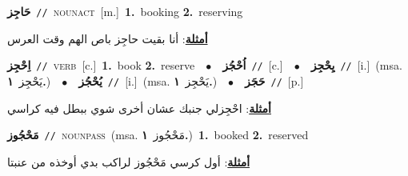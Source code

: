 \documentclass[10pt,a4paper,twoside]{article} %
\begin{document}
\begin{multicols}{2}
{{{{{{{{{{{\setlength\topsep{0pt}\textbf{\foreignlanguage{arabic}{حَاجِز}}\ {\color{gray}\texttt{//}\color{black}}\ \textsc{noun\textunderscore act}\ [m.]\ \textbf{1.}~booking  \textbf{2.}~reserving\  \begin{flushright}\color{gray}\foreignlanguage{arabic}{\textbf{\underline{\foreignlanguage{arabic}{أمثلة}}}: أنا بقيت حاجِز باص الهم وقت العرس}\end{flushright}\color{black}} \vspace{2mm}

{\setlength\topsep{0pt}\textbf{\foreignlanguage{arabic}{اِحْجِز}}\ {\color{gray}\texttt{//}\color{black}}\ \textsc{verb}\ [c.]\ \textbf{1.}~book  \textbf{2.}~reserve\ \ $\bullet$\ \ \setlength\topsep{0pt}\textbf{\foreignlanguage{arabic}{اُحْجُز}}\ {\color{gray}\texttt{//}\color{black}}\ [c.]\ \ $\bullet$\ \ \setlength\topsep{0pt}\textbf{\foreignlanguage{arabic}{يِحْجِز}}\ {\color{gray}\texttt{//}\color{black}}\ [i.]\ \color{gray}(msa. \foreignlanguage{arabic}{يَحْجِز}~\foreignlanguage{arabic}{\textbf{١.}})\color{black}\ \ $\bullet$\ \ \setlength\topsep{0pt}\textbf{\foreignlanguage{arabic}{يُحْجُز}}\ {\color{gray}\texttt{//}\color{black}}\ [i.]\ \color{gray}(msa. \foreignlanguage{arabic}{يَحْجِز}~\foreignlanguage{arabic}{\textbf{١.}})\color{black}\ \ $\bullet$\ \ \setlength\topsep{0pt}\textbf{\foreignlanguage{arabic}{حَجَز}}\ {\color{gray}\texttt{//}\color{black}}\ [p.]\  \begin{flushright}\color{gray}\foreignlanguage{arabic}{\textbf{\underline{\foreignlanguage{arabic}{أمثلة}}}: احْجِزلي جنبك عشان أخرى شوي ببطل فيه كراسي}\end{flushright}\color{black}} \vspace{2mm}

{\setlength\topsep{0pt}\textbf{\foreignlanguage{arabic}{مَحْجُوز}}\ {\color{gray}\texttt{//}\color{black}}\ \textsc{noun\textunderscore pass}\ \color{gray}(msa. \foreignlanguage{arabic}{مَحْجُوز}~\foreignlanguage{arabic}{\textbf{١.}})\color{black}\ \textbf{1.}~booked  \textbf{2.}~reserved\  \begin{flushright}\color{gray}\foreignlanguage{arabic}{\textbf{\underline{\foreignlanguage{arabic}{أمثلة}}}: أول كرسي مَحْجُوز لراكب بدي أوخذه من عنبتا}\end{flushright}\color{black}} \vspace{2mm}

}}}}}}}}}}
\end{multicols}
\end{document}
